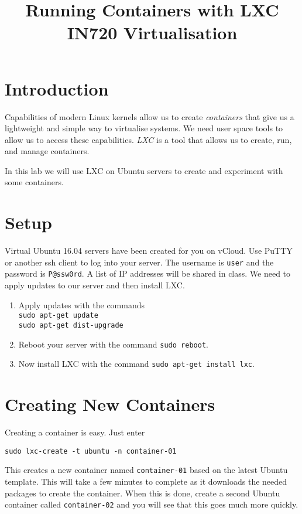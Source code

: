 \documentclass{article}
\begin{document}
\title{Running Containers with LXC\\ IN720 Virtualisation}
\date{}
\maketitle

\section*{Introduction}
Capabilities of modern Linux kernels allow us to create \emph{containers} that give us a lightweight and simple way to virtualise systems. We need user space tools to allow us to access these capabilities.  \emph{LXC} is a tool that allows us to create, run, and manage containers.

In this lab we will use LXC on Ubuntu servers to create and experiment with some containers.

\section{Setup}
Virtual Ubuntu 16.04 servers have been created for you on vCloud.  Use PuTTY or another ssh client to log into your server. The username is \texttt{user} and the password is \texttt{P@ssw0rd}. A list of IP addresses will be shared in class. We need to apply updates to our server and then install LXC.

\begin{enumerate}
	\item Apply updates with the commands \\
	\texttt{sudo apt-get update} \\
	\texttt{sudo apt-get dist-upgrade}
	\item Reboot your server with the command \texttt{sudo reboot}.
	\item Now install LXC with the command \texttt{sudo apt-get install lxc}.
\end{enumerate} 

\section{Creating New Containers}
Creating a container is easy.  Just enter
\begin{verbatim}
sudo lxc-create -t ubuntu -n container-01
\end{verbatim}

This creates a new container named \texttt{container-01} based on the latest Ubuntu template.  This will take a few minutes to complete as it downloads the needed packages to create the container.  When this is done, create a second Ubuntu container called \texttt{container-02} and you will see that this goes much more quickly.
\end{document}
